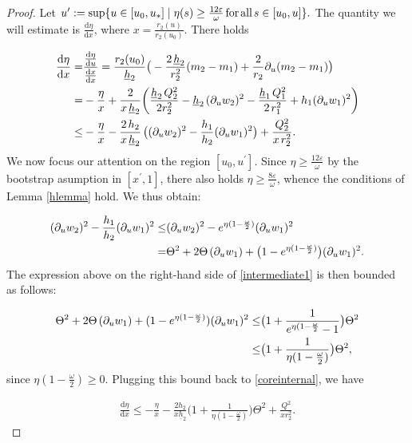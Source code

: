 \documentclass{article}[11pt]
\newcommand{\hsp}{\hspace{.5mm}}
\newcommand{\hba}{\underline{h}}
\newcommand{\upr}{u^{\prime}}
\numberwithin{equation}{section}
\begin{document}
\begin{proof}
Let $\upr:= \sup\{ u \in [u_0,u_*] \mid \eta(s) \geq \frac{12\varepsilon}{\omega} \hsp \text{for} \hsp \text{all} \hsp s\in [u_0,u]\}.$ The quantity we will estimate is $\frac{\text{d}\eta}{\text{d}x}$, where $x= \frac{r_2(u)}{r_2(u_0)}$. There holds 

\begin{align} \label{coreinternal} \frac{\text{d}\eta}{\text{d}x} =& \frac{\frac{\text{d}\eta}{\text{d}u}}{\frac{\text{d}x}{\text{d}x}}= \frac{r_2(u_0)}{\hba_2}\big(-\frac{2\hsp \hba_2}{r_2^2}(m_2-m_1) + \frac{2}{r_2}\partial_u (m_2-m_1)\big) \notag \\ =& -\frac{\eta}{x}+\frac{2}{x \hsp \hba_2} \bigg(\frac{\hba_2 \hsp Q_2^2}{2r_2^2}-\hba_2\hsp (\partial_u w_2)^2 - \frac{\hba_1 \hsp Q_1^2}{2\hsp r_1^2}+h_1(\partial_u w_1)^2\bigg) \notag \\ \leq& -\frac{\eta}{x}-\frac{2\hsp h_2}{x \hsp \hba_2}\hsp \big((\partial_u w_2)^2 - \frac{h_1}{h_2}(\partial_u w_1)^2\big) + \frac{Q_2^2}{x\hsp r_2^2}. \end{align} 
We now focus our attention on the region $[u_0, \upr]$. Since $\eta \geq \frac{12\varepsilon}{\omega}$ by the bootstrap asumption in $[x^\prime,1]$, there also holds $\eta \geq \frac{8\varepsilon}{\omega}$, whence the conditions of Lemma \ref{hlemma} hold. We thus obtain:

\begin{align}
(\partial_u w_2)^2 - \frac{h_1}{h_2}(\partial_u w_1)^2 \leq& (\partial_u w_2)^2 - e^{\eta(1-\frac{\omega}{2})} (\partial_u w_1)^2\notag \\ =& \Theta^2 +2\Theta \hsp (\partial_u w_1) + \big(1-e^{\eta(1-\frac{\omega}{2})}\big) (\partial_u w_1)^2. \label{intermediate1}
\end{align}The expression above on the right-hand side of \eqref{intermediate1} is then bounded as follows:

\begin{align}
\Theta^2 +2\Theta \hsp (\partial_u w_1) + (1-e^{\eta(1-\frac{\omega}{2})}) (\partial_u w_1)^2 \leq& \big(1 + \frac{1}{e^{\eta(1-\frac{\omega}{2}}-1}\big) \Theta^2 \notag \\ \leq& \big(1 + \frac{1}{\eta(1-\frac{\omega}{2})}\big) \Theta^2,
\end{align}since $\eta(1-\frac{\omega}{2}) \geq 0$. Plugging this bound back to \eqref{coreinternal}, we have

\begin{align}
\frac{\text{d}\eta}{\text{d}x}\leq -\frac{\eta}{x}- \frac{2h_2}{x \underline{h}_2}\big(1 + \frac{1}{\eta(1-\frac{\omega}{2})}\big) \Theta^2 + \frac{Q^2}{xr_2^2}. 
\end{align}


\end{proof}
\end{document}
